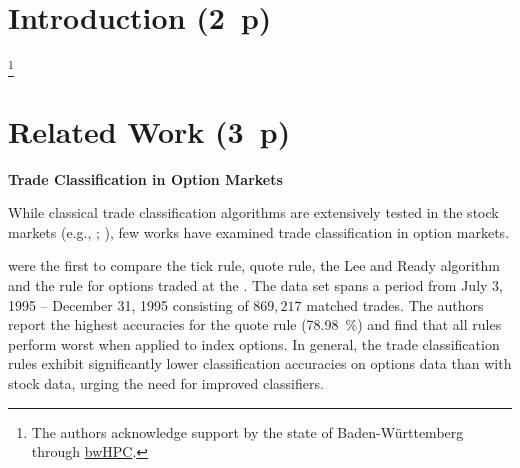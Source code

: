 \section{Introduction (2~p)}\label{sec:introduction}

\footnote{The authors acknowledge support by the state of Baden-Württemberg through \href{https://www.bwhpc.de/}{bwHPC}.}
\newpage

\section{Related Work (3~p)}\label{sec:related-work}

\textbf{Trade Classification in Option Markets}

While classical trade classification algorithms are extensively tested in the stock markets (e.g., \textcite[][3806--3821]{chakrabartyTradeClassificationAlgorithms2012}; \textcite[][259--286]{odders-whiteOccurrenceConsequencesInaccurate2000}), few works have examined trade classification in option markets.

\textcite[882--883]{savickasInferringDirectionOption2003} were the first to compare the tick rule, quote rule, the Lee and Ready algorithm and the  rule for options traded at the . The data set spans a period from July 3, 1995 -- December 31, 1995 consisting of $869{,}217$ matched trades. The authors report the highest accuracies for the quote rule (\SI{78.98}{\percent}) and find that all rules perform worst when applied to index options. In general, the trade classification rules exhibit significantly lower classification accuracies on options data than with stock data, urging the need for improved classifiers.

